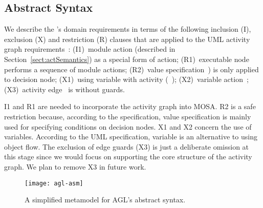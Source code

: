 \subsection{Abstract Syntax} 
\label{subsect:agl-abstractSyntax}

We describe the \agl's domain requirements in terms of the following inclusion (I), exclusion (X) and restriction (R) clauses that are applied to the UML activity graph requirements~\cite{omg_unified_2017}: (I1)~module action (described in Section~\ref{sect:actSemantics}) as a special form of action; (R1)~executable node performs a sequence of module actions; (R2)~value specification~\cite[p.~374]{omg_unified_2017}) is only applied to decision node; (X1)~using variable with activity (~\cite[p.~417]{omg_unified_2017}); (X2)~variable action~\cite[p.~467]{omg_unified_2017}; (X3)~activity edge~\cite[p.~373]{omg_unified_2017} is without guards.

I1 and R1 are needed to incorporate the activity graph into MOSA. R2 is a safe restriction because, according to the specification, value specification is mainly used for specifying conditions on decision nodes. X1 and X2 concern the use of variables. According to the UML specification, variable is an alternative to using object flow. The exclusion of edge guards (X3) is just a deliberate omission at this stage since we would focus on supporting the core structure of the activity graph. We plan to remove X3 in future work.
%
%
\begin{figure*}[ht]
	\vspace{-0.1cm}	
	\begin{center}
		\texttt{[image: agl-asm]}
	\end{center}
\vspace{-0.6cm}
	\caption{A simplified metamodel for AGL's abstract syntax.} %
	\label{fig:agl-abstractSyntax}
	\vspace{-0.2cm}
\end{figure*}

